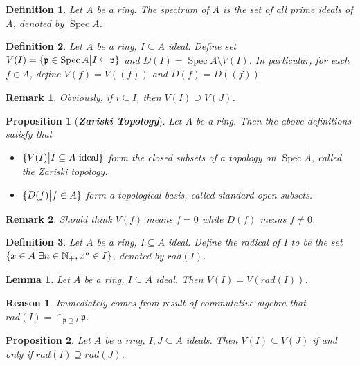\documentclass{ctexart}
\newtheorem{definition}{Definition}[section]
\newtheorem{remark}{Remark}[section]
\newtheorem{proposition}{Proposition}[section]
\newtheorem{lemma}{Lemma}[section]
\newtheorem{reason}{Reason}[section]
\newcommand{\spec}{\operatorname{Spec}}
\begin{document}
\begin{definition}
    Let $A$ be a ring.
    The spectrum of $A$ is the set of all prime ideals of $A$, denoted by $\spec A$.
\end{definition}
\begin{definition}
    Let $A$ be a ring, $I \subseteq A$ ideal.
    Define set $V(I) = \{\mathfrak{p}\in \spec A \big{|} I \subseteq \mathfrak{p}\}$ and $D(I) = \spec A \setminus V(I)$.
    In particular, for each $f\in A$, define $V(f) = V((f))$ and $D(f) = D((f))$.
\end{definition}
\begin{remark}
    Obviously, if $i \subseteq I$, then $V(I) \supseteq V(J)$.
\end{remark}
\begin{proposition}[\textbf{\emph{Zariski Topology}}]
    Let $A$ be a ring.
    Then the above definitions satisfy that
    \begin{itemize}
        \item $\{V(I) \big{|} I \subseteq A \text{ ideal}\}$ form the closed subsets of a topology on $\spec A$, called the Zariski topology.
        \item $\{D(f) \big{|} f\in A\}$ form a topological basis, called standard open subsets.
    \end{itemize}
    \label{Proposition 1.1}
\end{proposition}
\begin{remark}
    Should think $V(f)$ means $f = 0$ while $D(f)$ means $f \neq 0$.
\end{remark}
\begin{definition}
    Let $A$ be a ring, $I \subseteq A$ ideal.
    Define the radical of $I$ to be the set $\{x\in A \big{|} \exists n\in \mathbb{N}_{+}, x^n\in I\}$, denoted by $rad(I)$.
\end{definition}
\begin{lemma}
    Let $A$ be a ring, $I \subseteq A$ ideal.
    Then $V(I) = V(rad(I))$.
    \label{Lemma 1.1}
\end{lemma}
\begin{reason}
    Immediately comes from result of commutative algebra that $rad(I) = \cap_{\mathfrak{p} \supseteq I} \mathfrak{p}$.
\end{reason}
\begin{proposition}
    Let $A$ be a ring, $I,J \subseteq A$ ideals.
    Then $V(I) \subseteq V(J)$ if and only if $rad(I) \supseteq rad(J)$.
    \label{Proposition 1.2}
\end{proposition}
\end{document}
